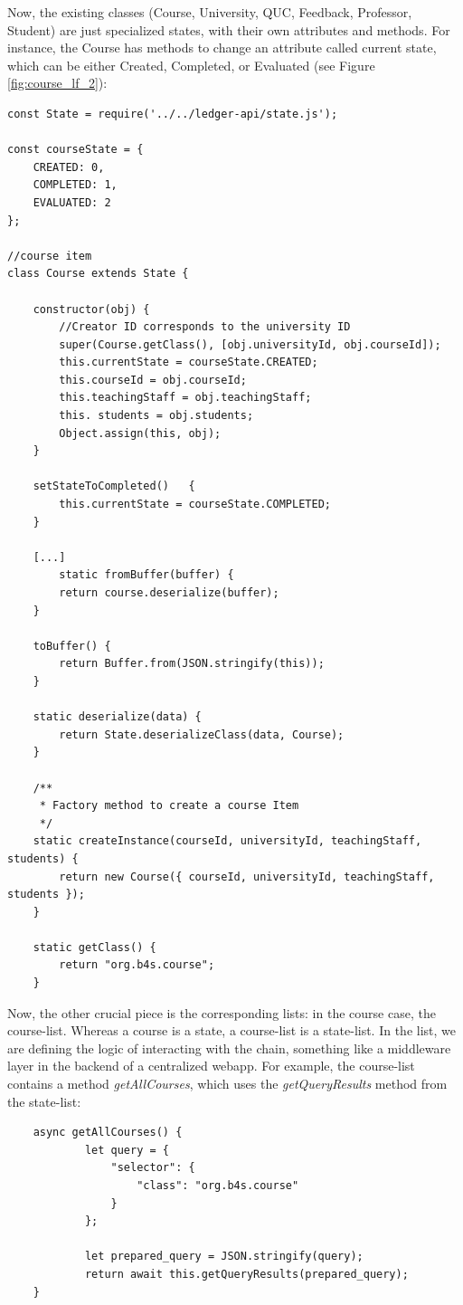 \documentclass[12pt,a4paper]{article}
\theoremstyle{definition}
\begin{document}
Now, the existing classes (Course, University, QUC, Feedback, Professor, Student) are just specialized states, with their own attributes and methods. For instance, the Course has methods to change an attribute called current state, which can be either Created, Completed, or Evaluated (see Figure \ref{fig:course_lf_2}):
\begin{verbatim}
const State = require('../../ledger-api/state.js');

const courseState = {
    CREATED: 0,
    COMPLETED: 1,
    EVALUATED: 2
};

//course item
class Course extends State {

    constructor(obj) {
        //Creator ID corresponds to the university ID
        super(Course.getClass(), [obj.universityId, obj.courseId]);
        this.currentState = courseState.CREATED;
        this.courseId = obj.courseId;
        this.teachingStaff = obj.teachingStaff;
        this. students = obj.students;
        Object.assign(this, obj);
    }

    setStateToCompleted()   {
        this.currentState = courseState.COMPLETED;
    }
    
    [...]
        static fromBuffer(buffer) {
        return course.deserialize(buffer);
    }

    toBuffer() {
        return Buffer.from(JSON.stringify(this));
    }

    static deserialize(data) {
        return State.deserializeClass(data, Course);
    }

    /**
     * Factory method to create a course Item
     */
    static createInstance(courseId, universityId, teachingStaff, students) {
        return new Course({ courseId, universityId, teachingStaff, students });
    }

    static getClass() {
        return "org.b4s.course";
    }

\end{verbatim}

Now, the other crucial piece is the corresponding lists: in the course case, the course-list. Whereas a course is a state, a course-list is a state-list. In the list, we are defining the logic of interacting with the chain, something like a middleware layer in the backend of a centralized webapp. For example, the course-list contains a method \emph{getAllCourses}, which uses the \emph{getQueryResults} method from the state-list:
\begin{verbatim}
    async getAllCourses() {
            let query = {
                "selector": {
                    "class": "org.b4s.course"
                }
            };

            let prepared_query = JSON.stringify(query);
            return await this.getQueryResults(prepared_query);
    }

\end{verbatim}
\end{document}
